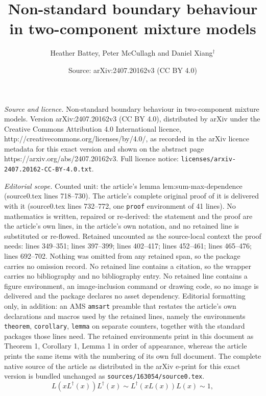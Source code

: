 \documentclass[10pt,a4paper]{amsart}
\title{Non-standard boundary behaviour in two-component mixture models}
\author{Heather Battey, \quad Peter McCullagh \quad and \quad Daniel Xiang$^{\dagger}$}
\date{Source: arXiv:2407.20162v3 (CC BY 4.0)}
\begin{document}
\maketitle

\noindent\emph{Source and licence.} Non-standard boundary behaviour in two-component mixture models. Version arXiv:2407.20162v3 (CC BY 4.0), distributed by arXiv under the Creative Commons Attribution 4.0 International licence, http://creativecommons.org/licenses/by/4.0/, as recorded in the arXiv licence metadata for this exact version and shown on the abstract page https://arxiv.org/abs/2407.20162v3. Full licence notice: \texttt{licenses/arxiv-2407.20162-CC-BY-4.0.txt}.\par\smallskip

\noindent\textit{Editorial scope.} Counted unit: the article's lemma lem:sum-max-dependence (source0.tex lines 718--730). The article's complete original proof of it is delivered with it (source0.tex lines 732--772, one \texttt{proof} environment of 41 lines). No mathematics is written, repaired or re-derived: the statement and the proof are the article's own lines, in the article's own notation, and no retained line is substituted or re-flowed.  Retained uncounted as the source-local context the proof needs: lines 349--351; lines 397--399; lines 402--417; lines 452--461; lines 465--476; lines 692--702.  Nothing was omitted from any retained span, so the package carries no omission record.  No retained line contains a citation, so the wrapper carries no bibliography and no bibliography entry.  No retained line contains a figure environment, an image-inclusion command or drawing code, so no image is delivered and the package declares no asset dependency.  Editorial formatting only, in addition: an AMS \texttt{amsart} preamble that restates the article's own declarations and macros used by the retained lines, namely the environments \texttt{theorem}, \texttt{corollary}, \texttt{lemma} on separate counters, together with the standard packages those lines need.  The retained environments print in this document as Theorem 1, Corollary 1, Lemma 1 in order of appearance, whereas the article prints the same items with the numbering of its own full document.  The complete native source of the article as distributed in the arXiv e-print for this exact version is bundled unchanged as \texttt{sources/163054/source0.tex}.
\begin{equation}\label{eqDB}
L(x L^\dagger(x)) L^\dagger(x) \sim L^\dagger(x L(x)) L(x) \sim 1,
\end{equation}
\end{document}
